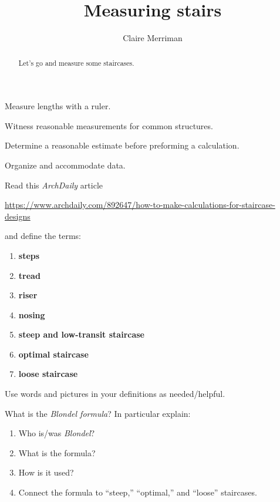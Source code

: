 \documentclass[handout,nooutcomes,noauthor,hints,12pt]{ximera}
\title{Measuring stairs}
\author{Claire Merriman}
\begin{document}
\begin{abstract}
  Let's go and measure some staircases.
\end{abstract}
\maketitle


\begin{listOutcomes}
\item Measure lengths with a ruler.
\item Witness reasonable measurements for common structures.
\item Determine a reasonable estimate before preforming a calculation.
\item Organize and accommodate data.
\end{listOutcomes}





\mynewpage


\begin{question}
Read this \textit{ArchDaily} article
  \begin{center}\small
    \url{https://www.archdaily.com/892647/how-to-make-calculations-for-staircase-designs}
  \end{center}
and define the terms:
\begin{enumerate}
\item \textbf{steps}
\item \textbf{tread}
\item \textbf{riser}
\item \textbf{nosing}
\item \textbf{steep and low-transit staircase}
\item \textbf{optimal staircase}
\item \textbf{loose staircase}
\end{enumerate}
Use words and pictures in your definitions as needed/helpful.

\end{question}


\mynewpage

\begin{question}
  What is the \textit{Blondel formula}? In particular explain:
  \begin{enumerate}
  \item Who is/was \textit{Blondel}?
  \item What is the formula?
  \item How is it used?
  \item Connect the formula to ``steep,'' ``optimal,'' and ``loose''
    staircases.
  \end{enumerate}
\end{question}
\end{document}
